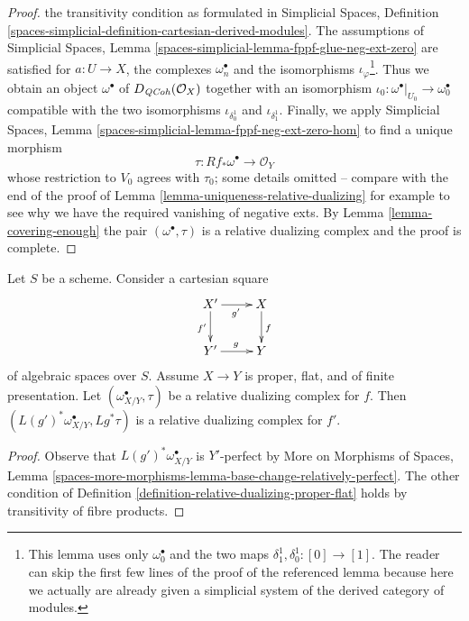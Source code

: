 \begin{proof}
the transitivity condition as formulated in
Simplicial Spaces, Definition
\ref{spaces-simplicial-definition-cartesian-derived-modules}.
The assumptions of Simplicial Spaces, Lemma
\ref{spaces-simplicial-lemma-fppf-glue-neg-ext-zero}
are satisfied for $a : U \to X$, the complexes $\omega_n^\bullet$
and the isomorphisms $\iota_\varphi$\footnote{This lemma uses only
$\omega_0^\bullet$ and the two maps $\delta_1^1, \delta_0^1 : [0] \to [1]$.
The reader can skip the first few lines of the proof of the
referenced lemma
because here we actually are already given a simplicial system of
the derived category of modules.}.
Thus we obtain an object $\omega^\bullet$ of $D_{\mathit{QCoh}}(\mathcal{O}_X)$
together with an isomorphism
$\iota_0 : \omega^\bullet|_{U_0} \to \omega_0^\bullet$
compatible with the two isomorphisms
$\iota_{\delta^1_0}$ and $\iota_{\delta^1_1}$.
Finally, we apply
Simplicial Spaces, Lemma
\ref{spaces-simplicial-lemma-fppf-neg-ext-zero-hom}
to find a unique morphism
$$
\tau : Rf_*\omega^\bullet \longrightarrow \mathcal{O}_Y
$$
whose restriction to $V_0$ agrees with $\tau_0$; some details omitted --
compare with the end of the proof of
Lemma \ref{lemma-uniqueness-relative-dualizing}
for example to see why we have
the required vanishing of negative exts.
By Lemma \ref{lemma-covering-enough}
the pair $(\omega^\bullet, \tau)$ is a relative dualizing complex
and the proof is complete.
\end{proof}

\begin{lemma}
\label{lemma-base-change-relative-dualizing}
Let $S$ be a scheme. Consider a cartesian square
$$
\xymatrix{
X' \ar[d]_{f'} \ar[r]_{g'} & X \ar[d]^f \\
Y' \ar[r]^g & Y
}
$$
of algebraic spaces over $S$. Assume $X \to Y$ is proper, flat, and
of finite presentation. Let $(\omega_{X/Y}^\bullet, \tau)$ be a
relative dualizing complex for $f$. Then
$(L(g')^*\omega_{X/Y}^\bullet, Lg^*\tau)$ is a relative dualizing
complex for $f'$.
\end{lemma}

\begin{proof}
Observe that $L(g')^*\omega_{X/Y}^\bullet$ is $Y'$-perfect by
More on Morphisms of Spaces, Lemma
\ref{spaces-more-morphisms-lemma-base-change-relatively-perfect}.
The other condition of
Definition \ref{definition-relative-dualizing-proper-flat}
holds by transitivity of fibre products.
\end{proof}







